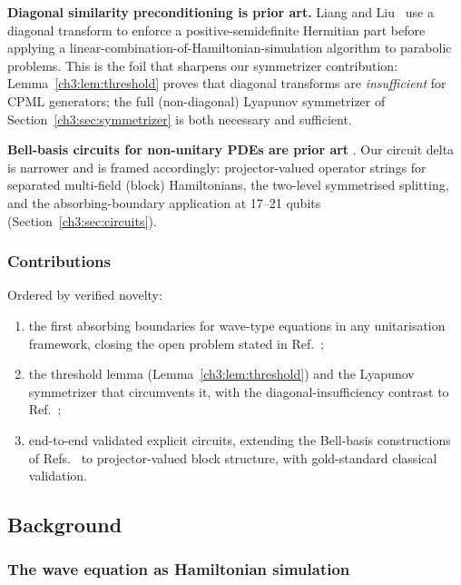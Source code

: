 \noindent\textbf{Diagonal similarity preconditioning is prior art.}  Liang and
Liu~\cite{liang2026structure} use a diagonal transform to enforce a
positive-semidefinite Hermitian part before applying a
linear-combination-of-Hamiltonian-simulation algorithm to parabolic
problems.  This is the foil that sharpens our symmetrizer contribution:
Lemma~\ref{ch3:lem:threshold} proves that diagonal transforms are
\emph{insufficient} for CPML generators; the full (non-diagonal) Lyapunov
symmetrizer of Section~\ref{ch3:sec:symmetrizer} is both necessary and
sufficient.

\noindent\textbf{Bell-basis circuits for non-unitary PDEs are prior art}
\cite{hu2024quantum,jin2024heat}.  Our circuit delta is narrower and is
framed accordingly: projector-valued operator strings for separated
multi-field (block) Hamiltonians, the two-level symmetrised splitting, and
the absorbing-boundary application at 17--21 qubits
(Section~\ref{ch3:sec:circuits}).

\subsubsection{Contributions}

Ordered by verified novelty:
\begin{enumerate}
\item the first absorbing boundaries for wave-type equations in any
  unitarisation framework, closing the open problem stated in
  Ref.~\cite{jin2025elastic};
\item the threshold lemma (Lemma~\ref{ch3:lem:threshold}) and the Lyapunov
  symmetrizer that circumvents it, with the diagonal-insufficiency
  contrast to Ref.~\cite{liang2026structure};
\item end-to-end validated explicit circuits, extending the Bell-basis
  constructions of Refs.~\cite{sato2024hamiltonian,hu2024quantum} to
  projector-valued block structure, with gold-standard classical
  validation.
\end{enumerate}

\subsection{Background}
\label{ch3:sec:background}

\subsubsection{The wave equation as Hamiltonian simulation}
\label{ch3:sec:wave}

